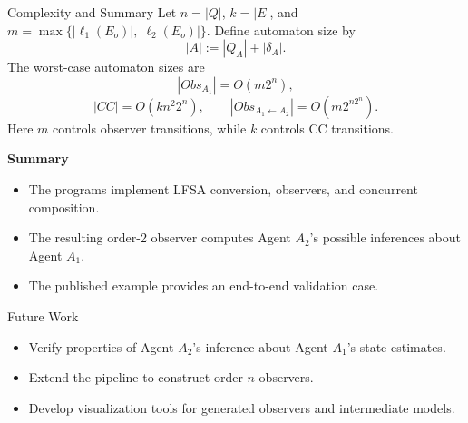\documentclass[10pt]{beamer}
\begin{document}
\begin{frame}{Complexity and Summary}
  Let $n=|Q|$, $k=|E|$, and
  $m=\max\{|\ell_1(E_o)|,|\ell_2(E_o)|\}$. Define automaton size by
  \[
    |A|:=|Q_A|+|\delta_A|.
  \]
  The worst-case automaton sizes are
  \[
    |Obs_{A_1}|=O(m2^n),
  \]
  \[
    |CC|=O(kn^2 2^n),
    \qquad
    |Obs_{A_1\leftarrow A_2}|=O\!\left(m2^{n2^n}\right).
  \]
  Here $m$ controls observer transitions, while $k$ controls CC transitions.

  \vspace{0.2cm}
  \textbf{Summary}
  \begin{itemize}
    \item The programs implement LFSA conversion, observers, and concurrent composition.
    \item The resulting order-2 observer computes Agent $A_2$'s possible inferences about Agent $A_1$.
    \item The published example provides an end-to-end validation case.
  \end{itemize}
\end{frame}

\begin{frame}{Future Work}
  \begin{itemize}
    \item Verify properties of Agent $A_2$'s inference about Agent $A_1$'s state estimates.
    \item Extend the pipeline to construct order-$n$ observers.
    \item Develop visualization tools for generated observers and intermediate models.
  \end{itemize}
\end{frame}
\end{document}
